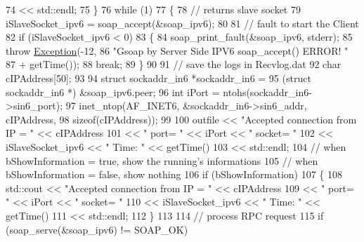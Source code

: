 \begin{DoxyCode}
74                         << std::endl;
75             \}
76             \textcolor{keywordflow}{while} (1)
77             \{
78                 \textcolor{comment}{// returns slave socket}
79                 iSlaveSocket\_ipv6 = soap\_accept(&soap\_ipv6);
80 
81                 \textcolor{comment}{// fault to start the Client}
82                 \textcolor{keywordflow}{if} (iSlaveSocket\_ipv6 < 0)
83                 \{
84                     soap\_print\_fault(&soap\_ipv6, stderr);
85                     \textcolor{keywordflow}{throw} \hyperlink{classException}{Exception}(-12,
86                             \textcolor{stringliteral}{"Gsoap by Server Side IPV6 soap\_accept() ERROR! "}
87                                     + getTime());
88                     \textcolor{keywordflow}{break};
89                 \}
90 
91                 \textcolor{comment}{// save the logs in Recvlog.dat}
92                 \textcolor{keywordtype}{char} cIPAddress[50];
93 
94                 \textcolor{keyword}{struct }sockaddr\_in6 *sockaddr\_in6 =
95                         (\textcolor{keyword}{struct }sockaddr\_in6 *) &soap\_ipv6.peer;
96                 \textcolor{keywordtype}{int} iPort = ntohs(sockaddr\_in6->sin6\_port);
97                 inet\_ntop(AF\_INET6, &sockaddr\_in6->sin6\_addr, cIPAddress,
98                         \textcolor{keyword}{sizeof}(cIPAddress));
99 
100                 outfile << \textcolor{stringliteral}{"Accepted connection from IP = "} << cIPAddress
101                         << \textcolor{stringliteral}{" port= "} << iPort << \textcolor{stringliteral}{" socket= "}
102                         << iSlaveSocket\_ipv6 << \textcolor{stringliteral}{" Time: "} << getTime()
103                         << std::endl;
104                 \textcolor{comment}{// when bShowInformation = true, show the running's informations}
105                 \textcolor{comment}{// when bShowInformation = false, show nothing}
106                 \textcolor{keywordflow}{if} (bShowInformation)
107                 \{
108                     std::cout << \textcolor{stringliteral}{"Accepted connection from IP = "} << cIPAddress
109                             << \textcolor{stringliteral}{" port= "} << iPort << \textcolor{stringliteral}{" socket= "}
110                             << iSlaveSocket\_ipv6 << \textcolor{stringliteral}{" Time: "} << getTime()
111                             << std::endl;
112                 \}
113 
114                 \textcolor{comment}{// process RPC request}
115                 \textcolor{keywordflow}{if} (soap\_serve(&soap\_ipv6) != SOAP\_OK)

\end{DoxyCode}
